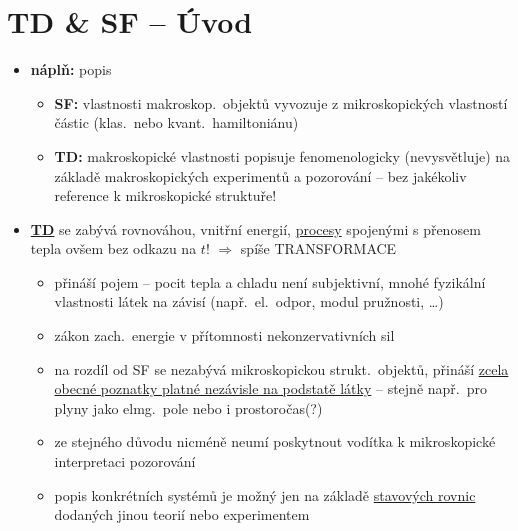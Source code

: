 \providecommand{\modre}[1]{\textcolor{NavyBlue}{#1}}

\section{TD \& SF -- Úvod}

\begin{itemize}
  \item \textbf{náplň:} popis 
  \begin{itemize}[label={}]
    \item \textbf{SF:} vlastnosti makroskop.\ objektů vyvozuje z mikroskopických vlastností částic (klas.\ nebo kvant.\ hamiltoniánu)
    \item \textbf{TD:} makroskopické vlastnosti popisuje fenomenologicky (nevysvětluje) na základě makroskopických experimentů a pozorování
          \modre{-- bez jakékoliv reference k mikroskopické struktuře!}
  \end{itemize}

  \item \underline{\textbf{TD}} se zabývá rovnováhou, vnitřní energií, \underline{procesy} spojenými s přenosem tepla
        \modre{ovšem bez odkazu na $t$! $\Rightarrow$ spíše TRANSFORMACE}
  \begin{itemize}
    \item[--] přináší pojem  -- pocit tepla a chladu není subjektivní, mnohé fyzikální vlastnosti látek na  závisí (např.\ el.\ odpor, modul pružnosti, \dots)
    \item[--]  zákon zach.\ energie v přítomnosti nekonzervativních sil
    \item[--] na rozdíl od SF se nezabývá mikroskopickou strukt.\ objektů, přináší \uline{zcela obecné poznatky platné nezávisle na podstatě látky} -- stejně např.\ pro plyny jako elmg.\ pole nebo i prostoročas(?)
    \item[--] ze stejného důvodu nicméně neumí poskytnout vodítka k mikroskopické interpretaci pozorování
    \item[--] popis konkrétních systémů je možný jen na základě \underline{stavových rovnic} dodaných jinou teorií nebo experimentem
  \end{itemize}


\end{itemize}
